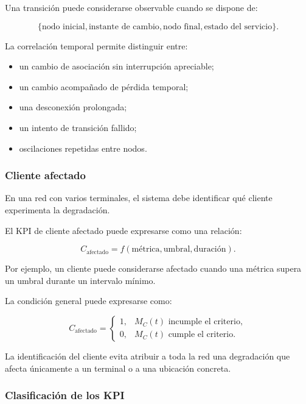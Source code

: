 Una transición puede considerarse observable cuando se dispone de:

\[
    \{
        \text{nodo inicial},
        \text{instante de cambio},
        \text{nodo final},
        \text{estado del servicio}
    \}.
\]

La correlación temporal permite distinguir entre:

\begin{itemize}
    \item un cambio de asociación sin interrupción apreciable;

    \item un cambio acompañado de pérdida temporal;

    \item una desconexión prolongada;

    \item un intento de transición fallido;

    \item oscilaciones repetidas entre nodos.
\end{itemize}


\subsubsection*{Cliente afectado}

En una red con varios terminales, el sistema debe identificar qué cliente
experimenta la degradación.

El KPI de cliente afectado puede expresarse como una relación:

\[
    C_{\mathrm{afectado}}
    =
    f
    \left(
        \text{métrica},
        \text{umbral},
        \text{duración}
    \right).
\]

Por ejemplo, un cliente puede considerarse afectado cuando una métrica
supera un umbral durante un intervalo mínimo.

La condición general puede expresarse como:

\[
    C_{\mathrm{afectado}}
    =
    \begin{cases}
        1, &
        M_C(t)
        \text{ incumple el criterio},\\
        0, &
        M_C(t)
        \text{ cumple el criterio}.
    \end{cases}
\]

La identificación del cliente evita atribuir a toda la red una
degradación que afecta únicamente a un terminal o a una ubicación
concreta.


\subsubsection*{Clasificación de los KPI}

